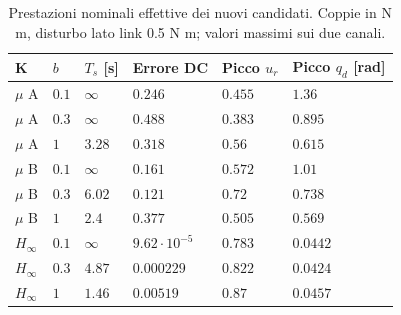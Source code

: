 \begin{table}[htbp]\centering\small
\begin{tabular}{llllll}\toprule
K & $b$ & $T_s$ [s] & Errore DC & Picco $u_r$ & Picco $q_d$ [rad]\\\midrule
$\mu$ A & $0.1$ & $\infty$ & $0.246$ & $0.455$ & $1.36$\\
$\mu$ A & $0.3$ & $\infty$ & $0.488$ & $0.383$ & $0.895$\\
$\mu$ A & $1$ & $3.28$ & $0.318$ & $0.56$ & $0.615$\\
$\mu$ B & $0.1$ & $\infty$ & $0.161$ & $0.572$ & $1.01$\\
$\mu$ B & $0.3$ & $6.02$ & $0.121$ & $0.72$ & $0.738$\\
$\mu$ B & $1$ & $2.4$ & $0.377$ & $0.505$ & $0.569$\\
$H_\infty$ & $0.1$ & $\infty$ & $9.62\cdot10^{-5}$ & $0.783$ & $0.0442$\\
$H_\infty$ & $0.3$ & $4.87$ & $0.000229$ & $0.822$ & $0.0424$\\
$H_\infty$ & $1$ & $1.46$ & $0.00519$ & $0.87$ & $0.0457$\\
\bottomrule\end{tabular}
\caption{Prestazioni nominali effettive dei nuovi candidati. Coppie in N m, disturbo lato link 0.5 N m; valori massimi sui due canali.}
\end{table}
